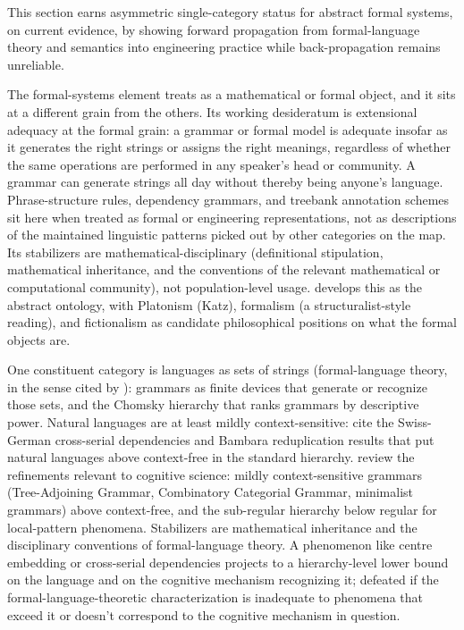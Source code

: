 \documentclass[12pt]{article}
\begin{document}
This section earns asymmetric single-category status for abstract formal systems, on current evidence, by showing forward propagation from formal-language theory and semantics into engineering practice while back-propagation remains unreliable.

The formal-systems element treats  as a mathematical or formal object, and it sits at a different grain from the others. Its working desideratum is extensional adequacy at the formal grain: a grammar or formal model is adequate insofar as it generates the right strings or assigns the right meanings, regardless of whether the same operations are performed in any speaker's head or community. A grammar can generate strings all day without thereby being anyone's language. Phrase-structure rules, dependency grammars, and treebank annotation schemes sit here when treated as formal or engineering representations, not as descriptions of the maintained linguistic patterns picked out by other categories on the map. Its stabilizers are mathematical-disciplinary (definitional stipulation, mathematical inheritance, and the conventions of the relevant mathematical or computational community), not population-level usage. \textcite{santana2016language} develops this as the abstract ontology, with Platonism (Katz), formalism (a structuralist-style reading), and fictionalism as candidate philosophical positions on what the formal objects are.

One constituent category is languages as sets of strings (formal-language theory, in the sense cited by \citealt{hauser2002}): grammars as finite devices that generate or recognize those sets, and the Chomsky hierarchy that ranks grammars by descriptive power. Natural languages are at least mildly context-sensitive: \citeauthor{pinkerjackendoff2005} cite the Swiss-German cross-serial dependencies and Bambara reduplication results that put natural languages above context-free in the standard hierarchy. \textcite{jagerrogers2012} review the refinements relevant to cognitive science: mildly context-sensitive grammars (Tree-Adjoining Grammar, Combinatory Categorial Grammar, minimalist grammars) above context-free, and the sub-regular hierarchy below regular for local-pattern phenomena. Stabilizers are mathematical inheritance and the disciplinary conventions of formal-language theory. A phenomenon like centre embedding or cross-serial dependencies projects to a hierarchy-level lower bound on the language and on the cognitive mechanism recognizing it; defeated if the formal-language-theoretic characterization is inadequate to phenomena that exceed it or doesn't correspond to the cognitive mechanism in question.
\end{document}
